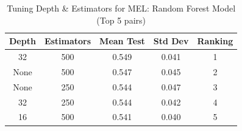 \documentclass[11pt]{article}
\begin{document}
\begin{table}[H]
\centering
\caption{Tuning Depth \& Estimators for MEL: Random Forest Model (Top 5 pairs)}
\begin{tabular}{|c|c|c|c|c|}
 \toprule
 Depth & Estimators & Mean Test & Std Dev & Ranking\\
 \midrule
 32 & 500 & 0.549 & 0.041 & 1\\
 None & 500 & 0.547 & 0.045 & 2\\
 None & 250 & 0.544 & 0.047 & 3\\
 32 & 250 & 0.544 & 0.042 & 4\\
 16 & 500 & 0.541 & 0.040 & 5\\
 \bottomrule
\end{tabular}
\end{table}
\end{document}
